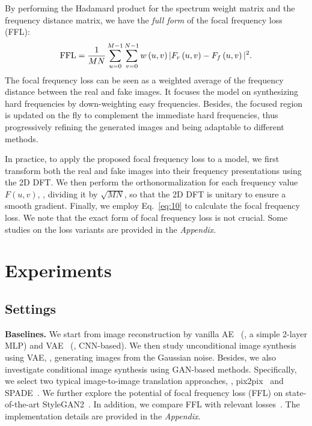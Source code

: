 \documentclass[10pt,twocolumn,letterpaper]{article}
\begin{document}
By performing the Hadamard product for the spectrum weight matrix and the frequency distance matrix, we have the \textit{full form} of the focal frequency loss (FFL):
\begin{equation}
\small
\label{eq:10}
    \mathrm{FFL}=\frac{1}{MN}\sum_{u=0}^{M-1}\sum_{v=0}^{N-1}{w\left(u,v\right)|F_r\left(u,v\right)-F_f\left(u,v\right)|^2}.
\end{equation}
The focal frequency loss can be seen as a weighted average of the frequency distance between the real and fake images.
It focuses the model on synthesizing hard frequencies by down-weighting easy frequencies. Besides, the focused region is updated on the fly to complement the immediate hard frequencies, thus progressively refining the generated images and being adaptable to different methods.

In practice, to apply the proposed focal frequency loss to a model, we first transform both the real and fake images into their frequency presentations using the 2D DFT.
We then perform the orthonormalization for each frequency value $F\left(u,v\right)$, \ie, dividing it by $\sqrt{MN}$, so that the 2D DFT is unitary to ensure a smooth gradient.
Finally, we employ Eq.~\eqref{eq:10} to calculate the focal frequency loss.
We note that the exact form of focal frequency loss is not crucial.
Some studies on the loss variants are provided in the \textit{Appendix}.









%
 

\section{Experiments}
\label{sec:experiments}





\subsection{Settings}
\label{sec:settings}
\noindent
\textbf{Baselines.}
We start from image reconstruction by vanilla AE~\cite{ae} (\ie, a simple 2-layer MLP) and VAE~\cite{vae} (\ie, CNN-based).
We then study unconditional image synthesis using VAE, \ie, generating images from the Gaussian noise.
Besides, we also investigate conditional image synthesis using GAN-based methods. Specifically, we select two typical image-to-image translation approaches, \ie, pix2pix~\cite{pix2pix} and SPADE~\cite{SPADE}.
We further explore the potential of focal frequency loss (FFL) on state-of-the-art StyleGAN2~\cite{stylegan2}.
In addition, we compare FFL with relevant losses~\cite{perceptualloss,specreg}.
The implementation details are provided in the \textit{Appendix}.
\end{document}
